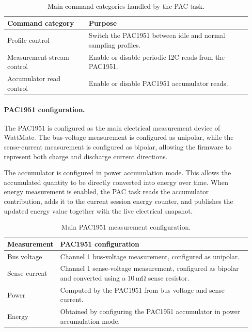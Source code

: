 \begin{table}[H]
	\centering
	\small
	\caption{Main command categories handled by the PAC task.}
	\label{tab:pac_task_commands}
	\begin{tabularx}{\textwidth}{lX}
		\toprule
		\textbf{Command category} & \textbf{Purpose} \\
		\midrule
		Profile control & Switch the PAC1951 between idle and normal sampling profiles. \\
		Measurement stream control & Enable or disable periodic I2C reads from the PAC1951. \\
		Accumulator read control & Enable or disable PAC1951 accumulator reads. \\
		\bottomrule
	\end{tabularx}
\end{table}

\paragraph{PAC1951 configuration.}
The PAC1951 is configured as the main electrical measurement device of WattMate. The bus-voltage measurement is configured as unipolar, while the sense-current measurement is configured as bipolar, allowing the firmware to represent both charge and discharge current directions.

The accumulator is configured in power accumulation mode. This allows the accumulated quantity to be directly converted into energy over time. When energy measurement is enabled, the PAC task reads the accumulator contribution, adds it to the current session energy counter, and publishes the updated energy value together with the live electrical snapshot.

\begin{table}[H]
	\centering
	\small
	\caption{Main PAC1951 measurement configuration.}
	\label{tab:pac_measurement_configuration}
	\begin{tabularx}{\textwidth}{lX}
		\toprule
		\textbf{Measurement} & \textbf{PAC1951 configuration} \\
		\midrule
		Bus voltage & Channel 1 bus-voltage measurement, configured as unipolar. \\
		Sense current & Channel 1 sense-voltage measurement, configured as bipolar and converted using a \(10\,\mathrm{m\Omega}\) sense resistor. \\
		Power & Computed by the PAC1951 from bus voltage and sense current. \\
		Energy & Obtained by configuring the PAC1951 accumulator in power accumulation mode. \\
		\bottomrule
	\end{tabularx}
\end{table}

